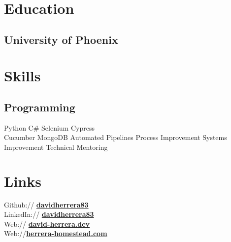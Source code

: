\documentclass[]{deedy-resume-openfont}
\begin{document}
%
%
\lastupdated
%
%
%
%
\begin{minipage}[t]{0.33\textwidth} 
\section{Education} 
\subsection{University of Phoenix}
\sectionsep
\section{Skills}
\subsection{Programming}
Python \textbullet{} {C\#} \textbullet{} Selenium \textbullet{} Cypress \\
Cucumber \textbullet{} MongoDB \textbullet{} Automated Pipelines
Process Improvement \textbullet{} Systems Improvement \textbullet{} Technical Mentoring
\sectionsep
\section{Links} 
Github:// \href{https://github.com/davidherrera83}{\bf davidherrera83} \\
LinkedIn:// \href{https://www.linkedin.com/in/davidherrera83}{\bf davidherrera83} \\
Web:// \href{https://david-herrera.dev}{\bf david-herrera.dev} \\
Web://\href{https://www.herrera-homestead.com}{\bf herrera-homestead.com} \\
\sectionsep

\end{minipage}
\end{document}
